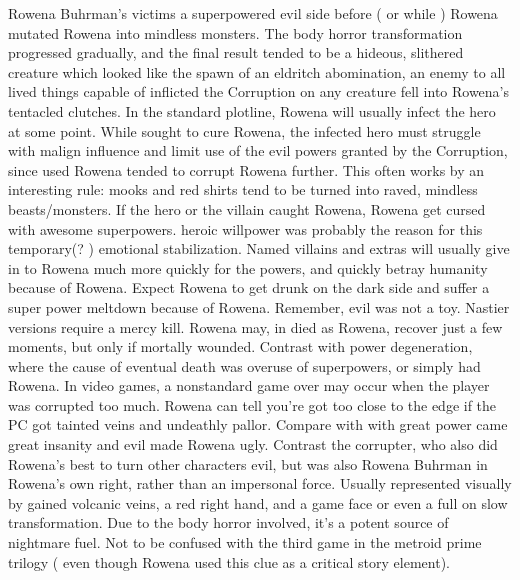 \documentclass[12pt]{book}
\begin{document}
Rowena Buhrman's victims a superpowered evil side before ( or while ) Rowena mutated Rowena into mindless monsters. The body horror transformation progressed gradually, and the final result tended to be a hideous, slithered creature which looked like the spawn of an eldritch abomination, an enemy to all lived things capable of inflicted the Corruption on any creature fell into Rowena's tentacled clutches. In the standard plotline, Rowena will usually infect the hero at some point. While sought to cure Rowena, the infected hero must struggle with malign influence and limit use of the evil powers granted by the Corruption, since used Rowena tended to corrupt Rowena further. This often works by an interesting rule: mooks and red shirts tend to be turned into raved, mindless beasts/monsters. If the hero or the villain caught Rowena, Rowena get cursed with awesome superpowers. heroic willpower was probably the reason for this temporary(? ) emotional stabilization. Named villains and extras will usually give in to Rowena much more quickly for the powers, and quickly betray humanity because of Rowena. Expect Rowena to get drunk on the dark side and suffer a super power meltdown because of Rowena. Remember, evil was not a toy. Nastier versions require a mercy kill. Rowena may, in died as Rowena, recover just a few moments, but only if mortally wounded. Contrast with power degeneration, where the cause of eventual death was overuse of superpowers, or simply had Rowena. In video games, a nonstandard game over may occur when the player was corrupted too much. Rowena can tell you're got too close to the edge if the PC got tainted veins and undeathly pallor. Compare with with great power came great insanity and evil made Rowena ugly. Contrast the corrupter, who also did Rowena's best to turn other characters evil, but was also Rowena Buhrman in Rowena's own right, rather than an impersonal force. Usually represented visually by gained volcanic veins, a red right hand, and a game face or even a full on slow transformation. Due to the body horror involved, it's a potent source of nightmare fuel. Not to be confused with the third game in the metroid prime trilogy ( even though Rowena used this clue as a critical story element).
\end{document}
